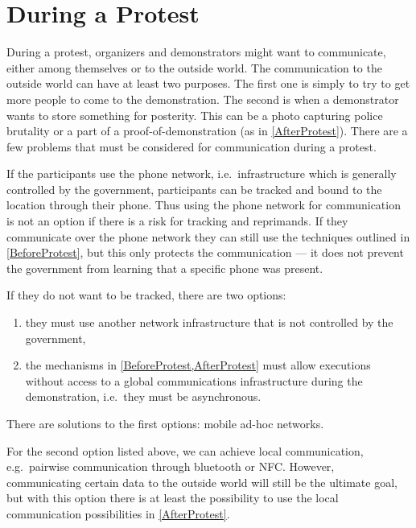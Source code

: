 \section{During a Protest}
\label{DuringProtest}

During a protest, organizers and demonstrators might want to communicate, 
either among themselves or to the outside world.
The communication to the outside world can have at least two purposes.
The first one is simply to try to get more people to come to the demonstration.
The second is when a demonstrator wants to store something for posterity.
This can be a photo capturing police brutality or a part of 
a proof-of-demonstration (as in \cref{AfterProtest}).
There are a few problems that must be considered for communication during 
a protest.

If the participants use the phone network, i.e.\ infrastructure which is 
generally controlled by the government, participants can be tracked and bound 
to the location through their phone.
Thus using the phone network for communication is not an option if there is 
a risk for tracking and reprimands.
If they communicate over the phone network they can still use the techniques 
outlined in \cref{BeforeProtest}, but this only protects the communication --- 
it does not prevent the government from learning that a specific phone was 
present.

If they do not want to be tracked, there are two options:
\begin{enumerate}
  \item they must use another network infrastructure that is not controlled by 
    the government,
  \item the mechanisms in \cref{BeforeProtest,AfterProtest} must allow 
    executions without access to a global communications infrastructure during 
    the demonstration, i.e.\ they must be asynchronous.
\end{enumerate}
There are solutions to the first options: mobile ad-hoc networks.


For the second option listed above, we can achieve local communication, e.g.\ 
pairwise communication through bluetooth or \ac{NFC}.
However, communicating certain data to the outside world will still be the 
ultimate goal, but with this option there is at least the possibility to use 
the local communication possibilities in \cref{AfterProtest}.


